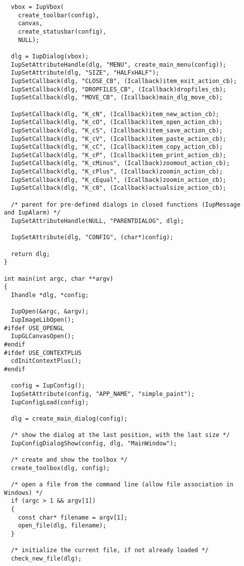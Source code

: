 \documentclass{ctexart}
\begin{document}
\begin{lstlisting}
  vbox = IupVbox(
    create_toolbar(config),
    canvas,
    create_statusbar(config),
    NULL);

  dlg = IupDialog(vbox);
  IupSetAttributeHandle(dlg, "MENU", create_main_menu(config));
  IupSetAttribute(dlg, "SIZE", "HALFxHALF");
  IupSetCallback(dlg, "CLOSE_CB", (Icallback)item_exit_action_cb);
  IupSetCallback(dlg, "DROPFILES_CB", (Icallback)dropfiles_cb);
  IupSetCallback(dlg, "MOVE_CB", (Icallback)main_dlg_move_cb);

  IupSetCallback(dlg, "K_cN", (Icallback)item_new_action_cb);
  IupSetCallback(dlg, "K_cO", (Icallback)item_open_action_cb);
  IupSetCallback(dlg, "K_cS", (Icallback)item_save_action_cb);
  IupSetCallback(dlg, "K_cV", (Icallback)item_paste_action_cb);
  IupSetCallback(dlg, "K_cC", (Icallback)item_copy_action_cb);
  IupSetCallback(dlg, "K_cP", (Icallback)item_print_action_cb);
  IupSetCallback(dlg, "K_cMinus", (Icallback)zoomout_action_cb);
  IupSetCallback(dlg, "K_cPlus", (Icallback)zoomin_action_cb);
  IupSetCallback(dlg, "K_cEqual", (Icallback)zoomin_action_cb);
  IupSetCallback(dlg, "K_c0", (Icallback)actualsize_action_cb);

  /* parent for pre-defined dialogs in closed functions (IupMessage and IupAlarm) */
  IupSetAttributeHandle(NULL, "PARENTDIALOG", dlg);

  IupSetAttribute(dlg, "CONFIG", (char*)config);

  return dlg;
}

int main(int argc, char **argv)
{
  Ihandle *dlg, *config;

  IupOpen(&argc, &argv);
  IupImageLibOpen();
#ifdef USE_OPENGL
  IupGLCanvasOpen();
#endif
#ifdef USE_CONTEXTPLUS
  cdInitContextPlus();
#endif

  config = IupConfig();
  IupSetAttribute(config, "APP_NAME", "simple_paint");
  IupConfigLoad(config);

  dlg = create_main_dialog(config);

  /* show the dialog at the last position, with the last size */
  IupConfigDialogShow(config, dlg, "MainWindow");

  /* create and show the toolbox */
  create_toolbox(dlg, config);

  /* open a file from the command line (allow file association in Windows) */
  if (argc > 1 && argv[1])
  {
    const char* filename = argv[1];
    open_file(dlg, filename);
  }

  /* initialize the current file, if not already loaded */
  check_new_file(dlg);


\end{lstlisting}
\end{document}
